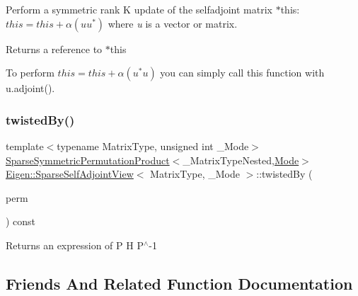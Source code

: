 Perform a symmetric rank K update of the selfadjoint matrix {\ttfamily $\ast$this}\+: $ this = this + \alpha ( u u^* ) $ where {\itshape u} is a vector or matrix.

\begin{DoxyReturn}{Returns}
a reference to {\ttfamily $\ast$this} 
\end{DoxyReturn}
To perform $ this = this + \alpha ( u^* u ) $ you can simply call this function with u.\+adjoint(). \mbox{\label{class_eigen_1_1_sparse_self_adjoint_view_acde15b45cf7b43520e1005ec65d55f3c}} 
\subsubsection{\texorpdfstring{twistedBy()}{twistedBy()}}
{\footnotesize\ttfamily template$<$typename Matrix\+Type, unsigned int \+\_\+\+Mode$>$ \\
\mbox{\hyperlink{class_eigen_1_1_sparse_symmetric_permutation_product}{Sparse\+Symmetric\+Permutation\+Product}}$<$\+\_\+\+Matrix\+Type\+Nested,\mbox{\hyperlink{struct_mode}{Mode}}$>$ \mbox{\hyperlink{class_eigen_1_1_sparse_self_adjoint_view}{Eigen\+::\+Sparse\+Self\+Adjoint\+View}}$<$ Matrix\+Type, \+\_\+\+Mode $>$\+::twisted\+By (\begin{DoxyParamCaption}\item[{const \mbox{\hyperlink{class_eigen_1_1_permutation_matrix}{Permutation\+Matrix}}$<$ Dynamic, Dynamic, Storage\+Index $>$ \&}]{perm }\end{DoxyParamCaption}) const\hspace{0.3cm}{\ttfamily [inline]}}

\begin{DoxyReturn}{Returns}
an expression of P H P$^\wedge$-\/1 
\end{DoxyReturn}


\subsection{Friends And Related Function Documentation}
\mbox{\label{class_eigen_1_1_sparse_self_adjoint_view_a6bc1b528571ce9bbb4de2b6de5a589c7}} 

